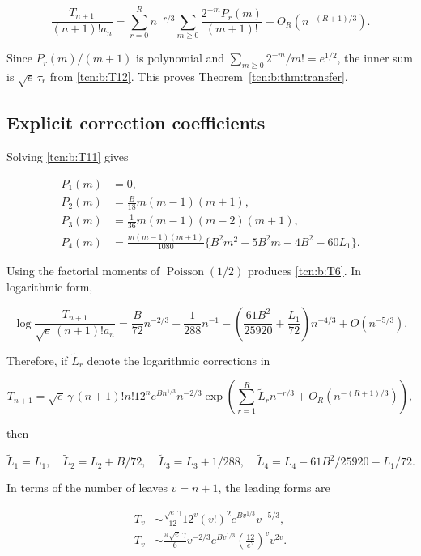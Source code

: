 \documentclass[11pt,letterpaper]{article}
\theoremstyle{remark}
\begin{document}
\[
 \frac{T_{n+1}}{(n+1)!a_n}
 =\sum_{r=0}^Rn^{-r/3}
   \sum_{m\ge0}\frac{2^{-m}P_r(m)}{(m+1)!}
 +O_R(n^{-(R+1)/3}).                                         \tag{T19}\label{tcn:b:T19}
\]

Since \(P_r(m)/(m+1)\) is polynomial and
\(\sum_{m\ge0}2^{-m}/m!=e^{1/2}\), the inner sum is \(\sqrt e\,\tau_r\)
from \eqref{tcn:b:T12}. This proves Theorem~\ref{tcn:b:thm:transfer}.

\subsection{Explicit correction
coefficients}\label{tcn:b:explicit-correction-coefficients}

Solving \eqref{tcn:b:T11} gives

\[
 \begin{aligned}
 P_1(m)&=0,\\
 P_2(m)&=\frac{B}{18}m(m-1)(m+1),\\
 P_3(m)&=\frac1{36}m(m-1)(m-2)(m+1),\\
 P_4(m)&=\frac{m(m-1)(m+1)}{1080}
          \{B^2m^2-5B^2m-4B^2-60L_1\}.
 \end{aligned}                                               \tag{T20}\label{tcn:b:T20}
\]

Using the factorial moments of \(\operatorname{Poisson}(1/2)\) produces
\eqref{tcn:b:T6}. In logarithmic form,

\[
 \log\frac{T_{n+1}}{\sqrt e\,(n+1)!a_n}
 =\frac B{72}n^{-2/3}+\frac1{288}n^{-1}
  -\left(\frac{61B^2}{25920}+\frac{L_1}{72}\right)n^{-4/3}
  +O(n^{-5/3}).                                               \tag{T21}\label{tcn:b:T21}
\]

Therefore, if \(\widetilde L_r\) denote the logarithmic corrections in

\[
 T_{n+1}=\sqrt e\,\gamma\,(n+1)!n!12^n
          e^{Bn^{1/3}}n^{-2/3}
          \exp\left(\sum_{r=1}^R\widetilde L_rn^{-r/3}
                +O_R(n^{-(R+1)/3})\right),                   \tag{T22}\label{tcn:b:T22}
\]

then

\[
 \widetilde L_1=L_1,\quad
 \widetilde L_2=L_2+B/72,\quad
 \widetilde L_3=L_3+1/288,\quad
 \widetilde L_4=L_4-61B^2/25920-L_1/72.                        \tag{T23}\label{tcn:b:T23}
\]

In terms of the number of leaves \(v=n+1\), the leading forms are

\[
 \begin{aligned}
 T_v&\sim\frac{\sqrt e\,\gamma}{12}
            12^v(v!)^2e^{Bv^{1/3}}v^{-5/3},\\
 T_v&\sim\frac{\pi\sqrt e\,\gamma}{6}
            v^{-2/3}e^{Bv^{1/3}}
            \left(\frac{12}{e^2}\right)^vv^{2v}.
 \end{aligned}                                               \tag{T24}\label{tcn:b:T24}
\]
\end{document}
